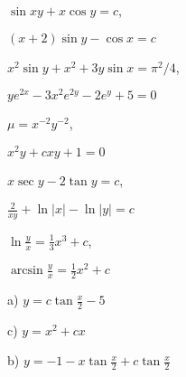 \documentclass[11pt]{amsbook}
\begin{document}
\begin{hEnumerateArabic}
\item
  \begin{multicols}{2}
    \begin{hEnumerateAlpha}
      \item $\sin xy + x \cos y = c$,
      \item $(x+2)\sin y - \cos x = c$
    \end{hEnumerateAlpha}
  \end{multicols}

\item
  \begin{multicols}{2}
    \begin{hEnumerateAlpha}
      \item $x^2\sin y + x^2 + 3y\sin x = \pi^2/4$,
      \item $ye^{2x} - 3x^2e^{2y} - 2e^y + 5 = 0$
    \end{hEnumerateAlpha}
  \end{multicols}

\item
  \begin{multicols}{2}
    \begin{hEnumerateAlpha}
      \item $\mu = x^{-2}y^{-2}$,
      \item $x^2y + cxy + 1 = 0$
    \end{hEnumerateAlpha}
  \end{multicols}

\item
  \begin{multicols}{2}
    \begin{hEnumerateAlpha}
      \item $x\sec y - 2\tan y = c$,
      \item $\frac{2}{xy} + \ln|x| - \ln|y| = c$
    \end{hEnumerateAlpha}
  \end{multicols}

\item
  \begin{multicols}{2}
    \begin{hEnumerateAlpha}
      \item $\ln\frac{y}{x} = \frac{1}{3}x^3 + c$,
      \item $\arcsin\frac{y}{x} = \frac{1}{2}x^2 + c$
    \end{hEnumerateAlpha}
  \end{multicols}

\item
  \begin{multicols}{2}
    \begin{hEnumerateAlpha}
      \item[a)] $y = c\tan\frac{x}{2} - 5$
      \item[c)] $y = x^2 + cx$
      \item[b)] $y = -1 - x\tan\frac{x}{2} + c\tan\frac{x}{2}$
      \item[]
    \end{hEnumerateAlpha}
  \end{multicols}


\end{hEnumerateArabic}
\end{document}

